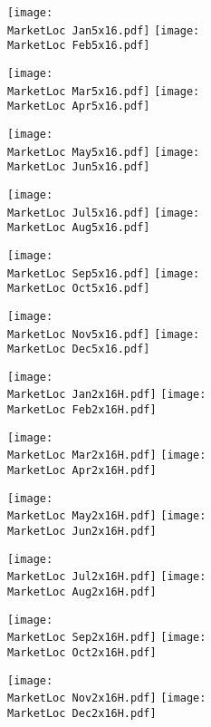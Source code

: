 \documentclass[letterpaper,12pt]{article}
\newcommand{\MarketLoc}{PWXCT}
\begin{document}
\clearpage
\begin{figure}
\vspace*{-2\baselineskip}
\centerline{ 
  \texttt{[image: \\MarketLoc Jan5x16.pdf]}
  \texttt{[image: \\MarketLoc Feb5x16.pdf]}}
\vspace*{-\baselineskip}
\centerline{ 
  \texttt{[image: \\MarketLoc Mar5x16.pdf]}
  \texttt{[image: \\MarketLoc Apr5x16.pdf]}}
\vspace*{-\baselineskip}
\centerline{ 
  \texttt{[image: \\MarketLoc May5x16.pdf]}
  \texttt{[image: \\MarketLoc Jun5x16.pdf]}}
\end{figure}

\begin{figure}
\vspace*{-2\baselineskip}
\centerline{ 
  \texttt{[image: \\MarketLoc Jul5x16.pdf]}
  \texttt{[image: \\MarketLoc Aug5x16.pdf]}}
\vspace*{-\baselineskip}
\centerline{ 
  \texttt{[image: \\MarketLoc Sep5x16.pdf]}
  \texttt{[image: \\MarketLoc Oct5x16.pdf]}}
\vspace*{-\baselineskip}
\centerline{ 
  \texttt{[image: \\MarketLoc Nov5x16.pdf]}
  \texttt{[image: \\MarketLoc Dec5x16.pdf]}}
\end{figure}

\begin{figure}
\vspace*{-2\baselineskip}
\centerline{ 
  \texttt{[image: \\MarketLoc Jan2x16H.pdf]}
  \texttt{[image: \\MarketLoc Feb2x16H.pdf]}}
\vspace*{-\baselineskip}
\centerline{ 
  \texttt{[image: \\MarketLoc Mar2x16H.pdf]}
  \texttt{[image: \\MarketLoc Apr2x16H.pdf]}}
\vspace*{-\baselineskip}
\centerline{ 
  \texttt{[image: \\MarketLoc May2x16H.pdf]}
  \texttt{[image: \\MarketLoc Jun2x16H.pdf]}}
\end{figure}

\begin{figure}
\vspace*{-2\baselineskip}
\centerline{ 
  \texttt{[image: \\MarketLoc Jul2x16H.pdf]}
  \texttt{[image: \\MarketLoc Aug2x16H.pdf]}}
\vspace*{-\baselineskip}
\centerline{ 
  \texttt{[image: \\MarketLoc Sep2x16H.pdf]}
  \texttt{[image: \\MarketLoc Oct2x16H.pdf]}}
\vspace*{-\baselineskip}
\centerline{ 
  \texttt{[image: \\MarketLoc Nov2x16H.pdf]}
  \texttt{[image: \\MarketLoc Dec2x16H.pdf]}}
\end{figure}
\end{document}

